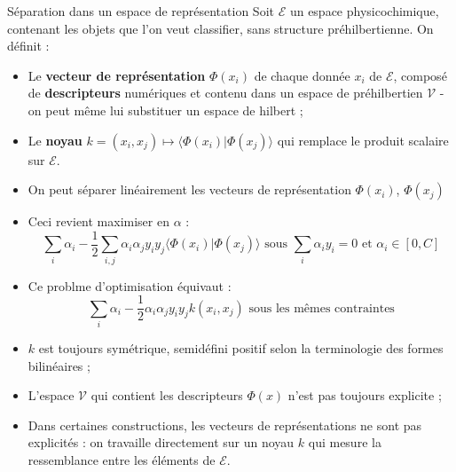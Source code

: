 \begin{frame}
\begin{block}{S\'eparation dans un espace de repr\'esentation}
Soit $\mathcal{E}$ un espace physicochimique, contenant les objets que l'on veut classifier, sans structure pr\'ehilbertienne. On d\'efinit :
\begin{itemize}
\item<+-> Le \textbf{vecteur de repr\'esentation} $\Phi (x_i)$ de chaque donn\'ee $x_i$ de $\mathcal{E}$, compos\'e de \textbf{descripteurs} num\'eriques %
et contenu dans un espace de pr\'ehilbertien $\mathcal{V}$ -on peut m\^eme lui substituer un espace de hilbert ;%
\item<+-> Le \textbf{noyau} $k=(x_i,x_j)\mapsto \langle \Phi (x_i)|\Phi (x_j)\rangle$ qui remplace le produit scalaire sur $\mathcal{E}$.
\end{itemize}
\end{block}
\end{frame}

\begin{frame}
\begin{itemize}
\item<+-> On peut s\'eparer lin\'eairement les vecteurs de repr\'esentation $\Phi (x_i)$, $\Phi (x_j)$
\item<+-> Ceci revient  maximiser en $\alpha$ :
\[\sum\limits_i\alpha_i-\frac{1}{2}\sum\limits_{i,j}\alpha_i\alpha_jy_iy_j\langle \Phi(x_i)|\Phi (x_j)\rangle%
\text{ sous }\sum_i\alpha_iy_i=0\text{ et }\alpha_i\in[0,C]\]
\item<+-> Ce problme d'optimisation \'equivaut  :
\[\sum\limits_i\alpha_i-\frac{1}{2}\alpha_i\alpha_j y_iy_jk(x_i,x_j)\text{ sous les m\^emes contraintes}\]
\end{itemize}
\end{frame}


\begin{frame}
\begin{block}{}
\begin{itemize}
\item<+-> $k$ est toujours sym\'etrique, semid\'efini positif selon la terminologie des formes bilin\'eaires ;
\item<+-> L'espace $\mathcal{V}$ qui contient les descripteurs $\Phi (x)$ n'est pas toujours explicite ;
\item<+-> Dans certaines constructions, les vecteurs de repr\'esentations ne sont pas explicit\'es : %
on travaille directement sur un noyau $k$ qui mesure la ressemblance entre les \'el\'ements de $\mathcal{E}$.
\end{itemize}
\end{block}
\end{frame}